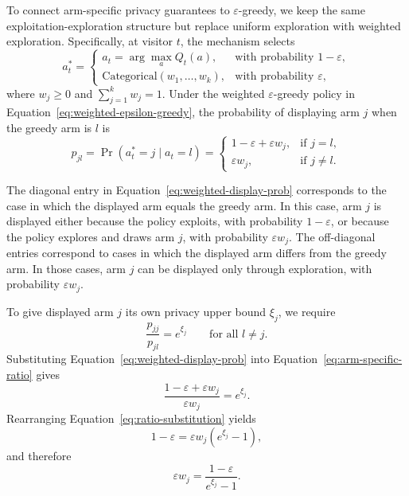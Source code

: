 \documentclass[mksc,nonblindrev]{informs3}
\begin{document}
\begin{APPENDICES}
To connect arm-specific privacy guarantees to $\varepsilon$-greedy, we keep the same exploitation-exploration structure but replace uniform exploration with weighted exploration.  Specifically, at visitor $t$, the mechanism selects
\begin{equation}
\label{eq:weighted-epsilon-greedy}
a_t^*
=
\begin{cases}
a_t=\arg\max_a Q_t(a), & \text{with probability } 1-\varepsilon,\\[4pt]
\text{Categorical}(w_1,\dots,w_k), & \text{with probability } \varepsilon,
\end{cases}
\end{equation}
where $w_j\geq 0$ and $\sum_{j=1}^k w_j=1$. Under the weighted $\varepsilon$-greedy policy in Equation~\eqref{eq:weighted-epsilon-greedy}, the probability of displaying arm $j$ when the greedy arm is $l$ is
\begin{equation}
\label{eq:weighted-display-prob}
p_{jl}
=
\Pr(a_t^*=j\mid a_t=l)
=
\begin{cases}
1-\varepsilon+\varepsilon w_j, & \text{if } j=l,\\[4pt]
\varepsilon w_j, & \text{if } j\neq l.
\end{cases}
\end{equation}

The diagonal entry in Equation~\eqref{eq:weighted-display-prob} corresponds to the case in which the displayed arm equals the greedy arm. In this case, arm $j$ is displayed either because the policy exploits, with probability $1-\varepsilon$, or because the policy explores and draws arm $j$, with probability $\varepsilon w_j$. The off-diagonal entries correspond to cases in which the displayed arm differs from the greedy arm. In those cases, arm $j$ can be displayed only through exploration, with probability $\varepsilon w_j$.

To give displayed arm $j$ its own privacy upper bound $\xi_j$, we require
\begin{equation}
\label{eq:arm-specific-ratio}
\frac{p_{jj}}{p_{jl}}
=
e^{\xi_j}
\qquad \text{for all } l\neq j.
\end{equation}
Substituting Equation~\eqref{eq:weighted-display-prob} into
Equation~\eqref{eq:arm-specific-ratio} gives
\begin{equation}
\label{eq:ratio-substitution}
\frac{1-\varepsilon+\varepsilon w_j}{\varepsilon w_j}
=
e^{\xi_j}.
\end{equation}
Rearranging Equation~\eqref{eq:ratio-substitution} yields
\begin{equation}
\label{eq:privacy-exploration-link}
1-\varepsilon
=
\varepsilon w_j(e^{\xi_j}-1),
\end{equation}
and therefore
\begin{equation}
\label{eq:epsilon-wj}
\varepsilon w_j
=
\frac{1-\varepsilon}{e^{\xi_j}-1}.
\end{equation}


\end{APPENDICES}
\end{document}
